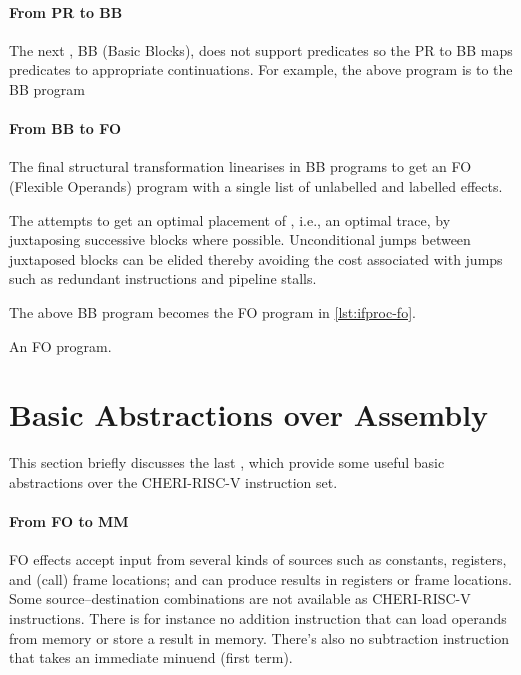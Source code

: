 \documentclass[main.tex]{subfiles}
\begin{document}
\paragraph{From PR to BB} The next , BB (Basic Blocks), does not support predicates so the PR to BB  maps predicates to appropriate continuations. For example, the above program is \lowered{} to the BB program

\paragraph{From BB to FO} The final structural transformation linearises  in BB programs to get an FO (Flexible Operands) program with a single list of unlabelled and labelled effects.

The  attempts to get an optimal placement of , i.e., an optimal trace, by juxtaposing successive blocks where possible. Unconditional jumps between juxtaposed blocks can be elided thereby avoiding the cost associated with jumps such as redundant instructions and pipeline stalls.

The above BB program becomes the FO program in \cref{lst:ifproc-fo}.
\begin{listing}[ht]
	\caption{An FO program.}
	\label{lst:ifproc-fo}
\end{listing}

\section{Basic Abstractions over Assembly} \label{sct:fo}

This section briefly discusses the last , which provide some useful basic abstractions over the CHERI-RISC-V instruction set.

\paragraph{From FO to MM} FO effects accept input from several kinds of sources such as constants, registers, and (call) frame locations; and can produce results in registers or frame locations. Some source–destination combinations are not available as CHERI-RISC-V instructions. There is for instance no addition instruction that can load operands from memory or store a result in memory. There's also no subtraction instruction that takes an immediate minuend (first term).
\end{document}
